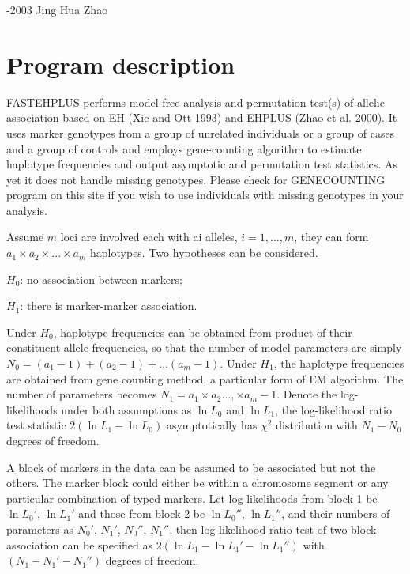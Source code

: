 \documentclass[11pt]{article}
\begin{document}
\pagestyle{myheadings}
\thispagestyle{empty}


\medskip{}-2003 Jing Hua Zhao

\section{Program description}

FASTEHPLUS performs model-free analysis and permutation test(s) of allelic
association based on EH (Xie and Ott 1993) and EHPLUS (Zhao et al.  2000).  It
uses marker genotypes from a group of unrelated individuals or a group of cases
and a group of controls and employs gene-counting algorithm to estimate
haplotype frequencies and output asymptotic and permutation test statistics.
As yet it does not handle missing genotypes. Please check for GENECOUNTING
program on this site if you wish to use individuals with missing genotypes
in your analysis.

Assume $m$ loci are involved each with ai alleles, $i=1,\dots,m$, they can
form $a_1 \times a_2 \times ...  \times a_m$ haplotypes.  Two hypotheses
can be considered.

\medskip
$H_0$: no association between markers;

\medskip
$H_1$: there is marker-marker association.
\medskip

Under $H_0$, haplotype frequencies can be obtained from product of their
constituent allele frequencies, so that the number of model parameters are
simply $N_0=(a_1-1)+(a_2-1)+...(a_m-1)$.  Under $H_1$, the haplotype
frequencies are obtained from gene counting method, a particular form of EM
algorithm.  The number of parameters becomes $N_1=a_1 \times a_2 \ldots, \times
a_m - 1$.  Denote the log-likelihoods under both assumptions as $\ln L_0$ and
$\ln L_1$, the log-likelihood ratio test statistic $2(\ln L_1-\ln L_0)$
asymptotically has $\chi^2$ distribution with $N_1-N_0$ degrees of freedom.

A block of markers in the data can be assumed to be associated but not the
others.  The marker block could either be within a chromosome segment or
any particular combination of typed markers.  Let log-likelihoods from
block 1 be $\ln L_0'$, $\ln L_1'$ and those from block 2 be $\ln L_0''$,
$\ln L_1''$, and their numbers of parameters as $N_0'$, $N_1'$, $N_0''$,
$N_1''$, then log-likelihood ratio test of two block association can be
specified as $2(\ln L_1-\ln L_1'-\ln L_1'')$ with $(N_1-N_1'-N_1'')$
degrees of freedom.
\end{document}
